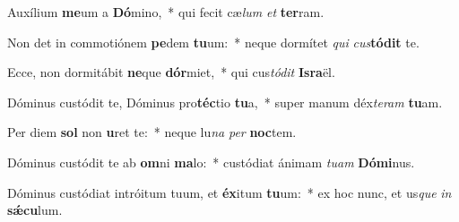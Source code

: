 \item Auxílium \textbf{me}um a \textbf{Dó}mino,~* qui fecit cæ\textit{lum} \textit{et} \textbf{ter}ram.
\item Non det in commotiónem \textbf{pe}dem \textbf{tu}um:~* neque dormítet \textit{qui} \textit{cus}\textbf{tó}\textbf{dit} te.
\item Ecce, non dormitábit \textbf{ne}que \textbf{dór}miet,~* qui cus\textit{tó}\textit{dit} \textbf{Is}\textbf{ra}ël.
\item Dóminus custódit te, Dóminus pro\textbf{téc}tio \textbf{tu}a,~* super manum déx\textit{te}\textit{ram} \textbf{tu}am.
\item Per diem \textbf{sol} non \textbf{u}ret te:~* neque lu\textit{na} \textit{per} \textbf{noc}tem.
\item Dóminus custódit te ab \textbf{om}ni \textbf{ma}lo:~* custódiat ánimam \textit{tu}\textit{am} \textbf{Dó}\textbf{mi}nus.
\item Dóminus custódiat intróitum tuum, et \textbf{éx}itum \textbf{tu}um:~* ex hoc nunc, et us\textit{que} \textit{in} \textbf{sǽ}\textbf{cu}lum.
